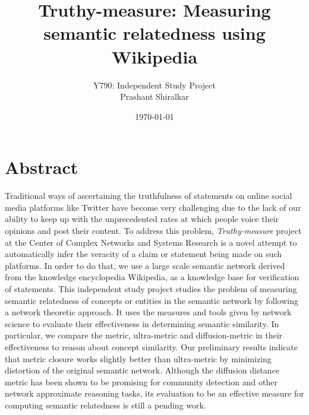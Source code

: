 \documentclass[12pt]{article}
\begin{document}
\title{Truthy-measure: Measuring semantic relatedness using Wikipedia}
\author{Y790: Independent Study Project \\ Prashant Shiralkar}
\date{\today}
\maketitle

\section{Abstract}
Traditional ways of ascertaining the truthfulness of statements on online social media platforms like Twitter have become very challenging due to the lack of our ability to keep up with the  unprecedented rates at which people voice their opinions and post their content. To address this problem, \textit{Truthy-measure} project at the Center of Complex Networks and Systems Research is a novel attempt to automatically infer the veracity of a claim or statement being made on such platforms. In order to do that, we use a large scale semantic network derived from the knowledge encyclopedia Wikipedia, as a knowledge base for verification of statements. This independent study project studies the problem of measuring semantic relatedness of concepts or entities in the semantic network by following a network theoretic approach. It uses the measures and tools given by network science to evaluate their effectiveness in determining semantic similarity. In particular, we compare the metric, ultra-metric and diffusion-metric in their effectiveness to reason about concept similarity. Our preliminary results indicate that metric closure works slightly better than ultra-metric by minimizing distortion of the original semantic network. Although the diffusion distance metric has been shown to be promising for community detection and other network approximate reasoning tasks, its evaluation to be an effective measure for computing semantic relatedness is still a pending work. 
\end{document}
